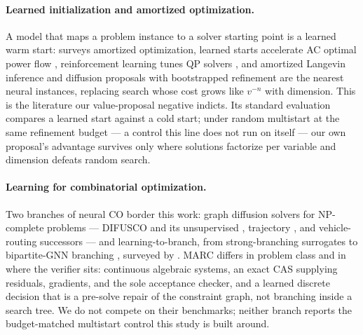 \documentclass[11pt]{article}
\begin{document}
\paragraph{Learned initialization and amortized optimization.}
A model that maps a problem instance to a solver starting point is a learned warm start:
\citet{amos2023amortized} surveys amortized optimization, learned starts accelerate AC
optimal power flow \citep{baker2019warmstart}, reinforcement learning tunes QP solvers
\citep{ichnowski2021rlqp}, and amortized Langevin inference \citep{taniguchi2022langevin} and
diffusion proposals with bootstrapped refinement \citep{bootstrapped2025refinement} are the
nearest neural instances, replacing search whose cost grows like $v^{-n}$ with dimension.
This is the literature our value-proposal negative indicts. Its standard evaluation compares
a learned start against a cold start; under random multistart at the same refinement budget
--- a control this line does not run on itself --- our own proposal's advantage survives only
where solutions factorize per variable and dimension defeats random search.

\paragraph{Learning for combinatorial optimization.}
Two branches of neural CO border this work: graph diffusion solvers for NP-complete problems
--- DIFUSCO \citep{sun2023difusco} and its unsupervised \citep{sanokowski2024diffuco},
trajectory \citep{li2024constraintaware}, and vehicle-routing \citep{anon2026vrpdiffusion}
successors --- and learning-to-branch, from strong-branching surrogates \citep{khalil2016branch}
to bipartite-GNN branching \citep{gasse2019exact}, surveyed by \citet{bengio2021mlco}. MARC
differs in problem class and in where the verifier sits: continuous algebraic systems, an
exact CAS supplying residuals, gradients, and the sole acceptance checker, and a learned
discrete decision that is a pre-solve repair of the constraint graph, not branching inside a
search tree. We do not compete on their benchmarks; neither branch reports the
budget-matched multistart control this study is built around.
\end{document}

